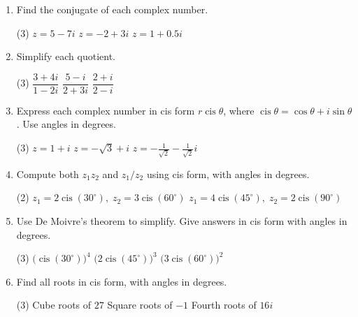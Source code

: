 \begin{enumerate}
\item Find the conjugate of each complex number.
\begin{tasks}[after-skip=20pt](3)
\task $z = 5 - 7i$
\task $z = -2 + 3i$
\task $z = 1 + 0.5i$
\end{tasks}

\item Simplify each quotient.
\begin{tasks}[after-skip=25pt](3)
\task $\dfrac{3 + 4i}{1 - 2i}$
\task $\dfrac{5 - i}{2 + 3i}$
\task $\dfrac{2 + i}{2 - i}$
\end{tasks}


\item Express each complex number in cis form $r\operatorname{cis}\theta$, where $\operatorname{cis}\theta=\cos\theta+i\sin\theta$. Use angles in degrees.
\begin{tasks}[after-skip=25pt](3)
\task $z = 1 + i$
\task $z = -\sqrt{3} + i$
\task $z = -\frac{1}{\sqrt{2}} - \frac{1}{\sqrt{2}}i$
\end{tasks}


\item Compute both $z_1z_2$ and $z_1/z_2$ using cis form, with angles in degrees.
\begin{tasks}[after-skip=25pt](2)
\task $z_1 = 2\operatorname{cis}(30^\circ),\; z_2 = 3\operatorname{cis}(60^\circ)$
\task $z_1 = 4\operatorname{cis}(45^\circ),\; z_2 = 2\operatorname{cis}(90^\circ)$
\end{tasks}

\item Use De Moivre's theorem to simplify. Give answers in cis form with angles in degrees.
\begin{tasks}[after-skip=20pt](3)
\task $\bigl(\operatorname{cis}(30^\circ)\bigr)^4$
\task $\bigl(2\operatorname{cis}(45^\circ)\bigr)^3$
\task $\bigl(3\operatorname{cis}(60^\circ)\bigr)^2$
\end{tasks}

\item Find all roots in cis form, with angles in degrees.
\begin{tasks}[after-skip=25pt](3)
\task Cube roots of $27$
\task Square roots of $-1$
\task Fourth roots of $16i$
\end{tasks}
 
\end{enumerate}